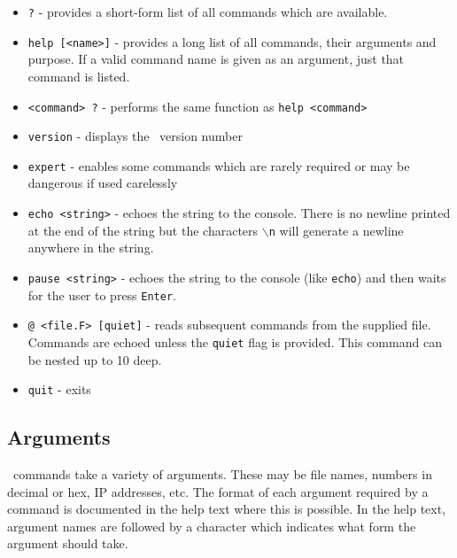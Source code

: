 \begin{itemize}

\item
\texttt{?} - provides a short-form list of all commands which are available.

\item
\texttt{help [<name>]} - provides a long list of all commands, their
arguments and purpose. If a valid command name is given as an argument,
just that command is listed.

\item 
\texttt{<command> ?} - performs the same function as \texttt{help <command>}

\item
\texttt{version} - displays the \ybug\ version number

\item
\texttt{expert} - enables some commands which are rarely required or
may be dangerous if used carelessly

\item
\texttt{echo <string>} - echoes the string to the console. There
is no newline printed at the end of the string but the characters
\texttt{$\backslash$n} will generate a newline anywhere in the string.

\item
\texttt{pause <string>} - echoes the string to the console (like
\texttt{echo}) and then waits for the user to press \texttt{Enter}.

\item
\texttt{@ <file.F> [quiet]} - reads subsequent commands from the
supplied file. Commands are echoed unless the \texttt{quiet} flag is
provided. This command can be nested up to 10 deep.

\item
\texttt{quit} - exits \ybug\

\end{itemize}

\subsection{Arguments}

\ybug\ commands take a variety of arguments. These may be file names,
numbers in decimal or hex, IP addresses, etc. The format of each
argument required by a command is documented in the help text where
this is possible. In the help text, argument names are followed by a
character which indicates what form the argument should take.

